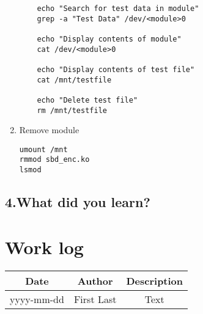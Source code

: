 \documentclass[onecolumn, draftclsnofoot,10pt, compsoc]{IEEEtran}
\begin{document}
\begin{enumerate}
\begin{lstlisting}
	echo "Search for test data in module"
	grep -a "Test Data" /dev/<module>0

	echo "Display contents of module"
	cat /dev/<module>0

	echo "Display contents of test file"
	cat /mnt/testfile

	echo "Delete test file"
	rm /mnt/testfile
\end{lstlisting}

\item Remove module
\begin{lstlisting}
umount /mnt
rmmod sbd_enc.ko
lsmod
\end{lstlisting}

	\end{enumerate}

	\subsection*{4.What did you learn?}


	\section*{Work log}
  	\begin{center}
    	\begin{tabular}{ |c|c|c| }
    		\hline
    		Date & Author & Description \\
    		\hline
    		yyyy-mm-dd & First Last & Text \\
    		\hline
    	\end{tabular}
  	\end{center}


  
  
\end{document}
